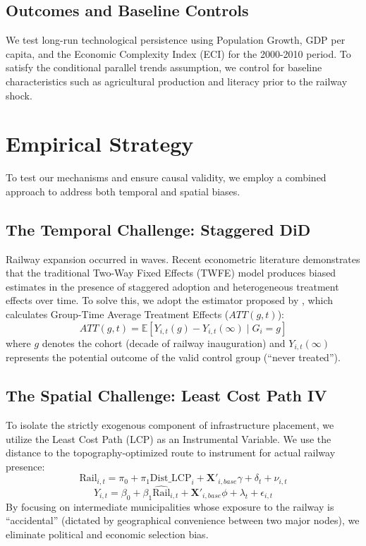 \documentclass[11pt, a4paper]{article}
\begin{document}
\subsection{Outcomes and Baseline Controls}
We test long-run technological persistence using Population Growth, GDP per capita, and the Economic Complexity Index (ECI) for the 2000-2010 period. To satisfy the conditional parallel trends assumption, we control for baseline characteristics such as agricultural production and literacy prior to the railway shock.

\section{Empirical Strategy}

To test our mechanisms and ensure causal validity, we employ a combined approach to address both temporal and spatial biases.

\subsection{The Temporal Challenge: Staggered DiD}
Railway expansion occurred in waves. Recent econometric literature demonstrates that the traditional Two-Way Fixed Effects (TWFE) model produces biased estimates in the presence of staggered adoption and heterogeneous treatment effects over time. To solve this, we adopt the estimator proposed by \cite{callaway2021}, which calculates Group-Time Average Treatment Effects ($ATT(g,t)$):
\begin{equation}
    ATT(g,t) = \mathbb{E}[Y_{i,t}(g) - Y_{i,t}(\infty) \mid G_i = g]
\end{equation}
where $g$ denotes the cohort (decade of railway inauguration) and $Y_{i,t}(\infty)$ represents the potential outcome of the valid control group (``never treated'').

\subsection{The Spatial Challenge: Least Cost Path IV}
To isolate the strictly exogenous component of infrastructure placement, we utilize the Least Cost Path (LCP) as an Instrumental Variable. We use the distance to the topography-optimized route to instrument for actual railway presence:
\begin{equation}
    \text{Rail}_{i,t} = \pi_0 + \pi_1 \text{Dist\_LCP}_{i} + \mathbf{X}'_{i, base} \gamma + \delta_t + \nu_{i,t}
\end{equation}
\begin{equation}
    Y_{i,t} = \beta_0 + \beta_1 \widehat{\text{Rail}}_{i,t} + \mathbf{X}'_{i, base} \phi + \lambda_t + \epsilon_{i,t}
\end{equation}
By focusing on intermediate municipalities whose exposure to the railway is ``accidental'' (dictated by geographical convenience between two major nodes), we eliminate political and economic selection bias.
\end{document}
